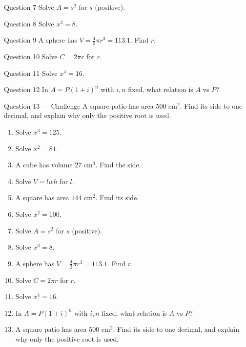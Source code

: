 \documentclass[11pt]{article}
\begin{document}
\begin{qbox}{Question 7}
Solve $A=s^2$ for $s$ (positive).\workspace{2.4cm}
\end{qbox}

\begin{qbox}{Question 8}
Solve $x^{3}=8$.\workspace{2.4cm}
\end{qbox}

\begin{qbox}{Question 9}
A sphere has $V=\tfrac43\pi r^3=113.1$. Find $r$.\workspace{2.4cm}
\end{qbox}

\begin{qbox}{Question 10}
Solve $C=2\pi r$ for $r$.\workspace{2.4cm}
\end{qbox}

\begin{qbox}{Question 11}
Solve $x^{4}=16$.\workspace{2.4cm}
\end{qbox}

\begin{qbox}{Question 12}
In $A=P(1+i)^n$ with $i,n$ fixed, what relation is $A$ vs $P$?\workspace{2.4cm}
\end{qbox}

\begin{qbox}{Question 13 --- Challenge}
A square patio has area $500$ cm$^2$. Find its side to one decimal, and explain why only the positive root is used.\workspace{3cm}
\end{qbox}

\clearpage
{}

\begin{recapbox}
\begin{multicols}{2}
\small
\begin{enumerate}[leftmargin=*,itemsep=3pt]
  \item Solve $x^{3}=125$.
  \item Solve $x^{2}=81$.
  \item A cube has volume $27$ cm$^3$. Find the side.
  \item Solve $V=lwh$ for $l$.
  \item A square has area $144$ cm$^2$. Find its side.
  \item Solve $x^{2}=100$.
  \item Solve $A=s^2$ for $s$ (positive).
  \item Solve $x^{3}=8$.
  \item A sphere has $V=\tfrac43\pi r^3=113.1$. Find $r$.
  \item Solve $C=2\pi r$ for $r$.
  \item Solve $x^{4}=16$.
  \item In $A=P(1+i)^n$ with $i,n$ fixed, what relation is $A$ vs $P$?
  \item A square patio has area $500$ cm$^2$. Find its side to one decimal, and explain why only the positive root is used.
\end{enumerate}
\end{multicols}
\end{recapbox}
\end{document}
